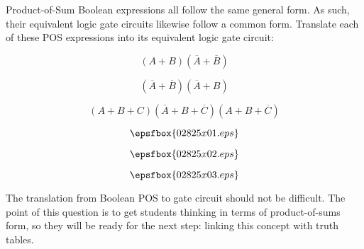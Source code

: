

Product-of-Sum Boolean expressions all follow the same general form.  As such, their equivalent logic gate circuits likewise follow a common form.  Translate each of these POS expressions into its equivalent logic gate circuit:

\vskip 10pt

$$(A + B)(\overline{A} + \overline{B})$$

\vskip 10pt

$$(\overline{A} + \overline{B})(\overline{A} + B)$$

\vskip 10pt

$$(A + B + C)(\overline{A} + B + \overline{C})(A + B + \overline{C})$$

\vskip 10pt







$$\epsfbox{02825x01.eps}$$

\vskip 30pt

$$\epsfbox{02825x02.eps}$$

\vskip 30pt

$$\epsfbox{02825x03.eps}$$







The translation from Boolean POS to gate circuit should not be difficult.  The point of this question is to get students thinking in terms of product-of-sums form, so they will be ready for the next step: linking this concept with truth tables.





